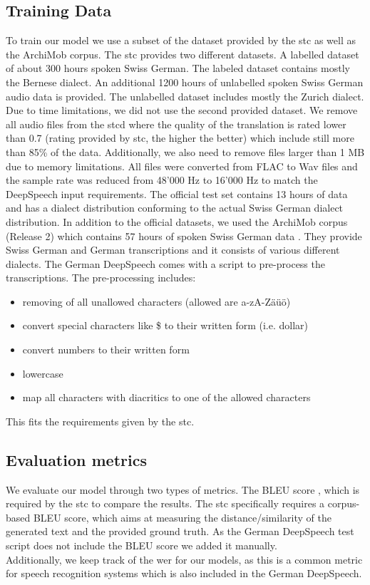 \subsection{Training Data}
To train our model we use a subset of the dataset provided by the \gls{stc} as well as the ArchiMob corpus. The \gls{stc} provides two different datasets. A labelled dataset of about 300 hours spoken Swiss German. The labeled dataset contains mostly the Bernese dialect. An additional 1200 hours of unlabelled spoken Swiss German audio data is provided. The unlabelled dataset includes mostly the Zurich dialect. Due to time limitations, we did not use the second provided dataset. We remove all audio files from the \gls{stcd} where the quality of the translation is rated lower than 0.7 (rating provided by \gls{stc}, the higher the better) which include still more than 85\% of the data. Additionally, we also need to remove files larger than 1 MB due to memory limitations. All files were converted from FLAC to Wav files and the sample rate was reduced from 48'000 Hz to 16'000 Hz to match the DeepSpeech input requirements. The official test set contains 13 hours of data and has a dialect distribution conforming to the actual Swiss German dialect distribution. In addition to the official datasets, we used the ArchiMob corpus (Release 2) which contains 57 hours of spoken Swiss German data \cite{archimob2016}. They provide Swiss German and German transcriptions and it consists of various different dialects.
The German DeepSpeech comes with a script to pre-process the transcriptions. The pre-processing includes:
\begin{itemize}
\item removing of all unallowed characters (allowed are a-zA-Zäüö)
\item convert special characters like \$ to their written form (i.e. dollar)
\item convert numbers to their written form
\item lowercase
\item map all characters with diacritics to one of the allowed characters
\end{itemize}

This fits the requirements given by the \gls{stc}.

\subsection{Evaluation metrics}
We evaluate our model through two types of metrics. The BLEU score \cite{Papineni2002BleuAM}, which is required by the \gls{stc} to compare the results. The \gls{stc} specifically requires a corpus-based BLEU score, which aims at measuring the distance/similarity of the generated text and the provided ground truth. As the German DeepSpeech test script does not include the BLEU score we added it manually. \\ Additionally, we keep track of the \gls{wer} for our models, as
this is a common metric for speech recognition systems \cite{Park2008AnEA} which is also included in the German DeepSpeech.

